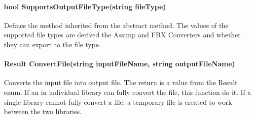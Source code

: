         \paragraph{bool SupportsOutputFileType(string fileType)}
            \hfill \break
            Defines the method inherited from the abstract method.  The values of the supported file types are derived the Assimp and FBX Converters and whether they can export to the file type.

        \paragraph{Result ConvertFile(string inputFileName, string outputFileName)}
            \hfill \break
            Converts the input file into output file.  The return is a value from the Result enum.  If an in individual library can fully convert the file, this function do it.  If a single library cannot fully convert a file, a temporary file is created to work between the two libraries.
        
        
